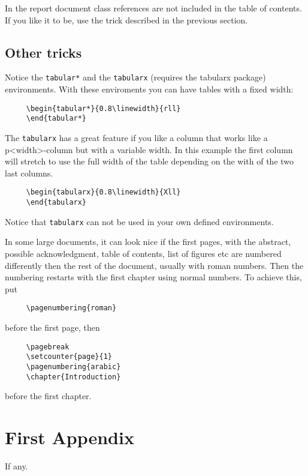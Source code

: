\documentclass[a4paper,11pt,oneside]{report}
\begin{document}
In the report document class references are not included in the
table of contents. If you like it to be, use the trick described in
the previous section.


\section{Other tricks}

Notice the \texttt{tabular*} and the \texttt{tabularx} (requires the
tabularx package) environments. With these enviroments you can have tables
with a fixed width:
\begin{verbatim}
     \begin{tabular*}{0.8\linewidth}{rll}
     \end{tabular*}
\end{verbatim}
The \texttt{tabularx} has a great feature if you like a column that works
like a p{<width>}-column but with a variable width. In this example
the first column will stretch to use the full width of the table
depending on the with of the two last columns.
\begin{verbatim}
     \begin{tabularx}{0.8\linewidth}{Xll}
     \end{tabularx}
\end{verbatim}
Notice that \texttt{tabularx} can not be used in your own defined
environments.


In some large documents, it can look nice if the first pages, with
the abstract, possible acknowledgment, table of contents, list of
figures etc are numbered differently then the rest of the document,
usually with roman numbers. Then the numbering restarts with the
first chapter using normal numbers. To achieve this, put
\begin{verbatim}
     \pagenumbering{roman}
\end{verbatim}
before the first page, then
\begin{verbatim}
     \pagebreak
     \setcounter{page}{1}
     \pagenumbering{arabic}
     \chapter{Introduction}
\end{verbatim}
before the first chapter.


%
%



\appendix

\chapter{First Appendix}

If any.
\end{document}
